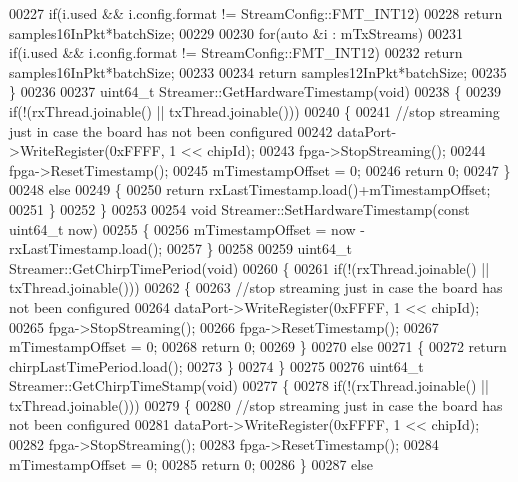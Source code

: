 \begin{DoxyCode}
00227         \textcolor{keywordflow}{if}(i.used && i.config.format != StreamConfig::FMT_INT12)
00228             \textcolor{keywordflow}{return} samples16InPkt*batchSize;
00229 
00230     \textcolor{keywordflow}{for}(\textcolor{keyword}{auto} &i : mTxStreams)
00231         \textcolor{keywordflow}{if}(i.used && i.config.format != StreamConfig::FMT_INT12)
00232             \textcolor{keywordflow}{return} samples16InPkt*batchSize;
00233 
00234     \textcolor{keywordflow}{return} samples12InPkt*batchSize;
00235 \}
00236 
00237 uint64\_t Streamer::GetHardwareTimestamp(\textcolor{keywordtype}{void})
00238 \{
00239     \textcolor{keywordflow}{if}(!(rxThread.joinable() || txThread.joinable()))
00240     \{
00241         \textcolor{comment}{//stop streaming just in case the board has not been configured}
00242         dataPort->WriteRegister(0xFFFF, 1 << chipId);
00243         fpga->StopStreaming();
00244         fpga->ResetTimestamp();
00245         mTimestampOffset = 0;
00246         \textcolor{keywordflow}{return} 0;
00247     \}
00248     \textcolor{keywordflow}{else}
00249     \{
00250         \textcolor{keywordflow}{return} rxLastTimestamp.load()+mTimestampOffset;
00251     \}
00252 \}
00253 
00254 \textcolor{keywordtype}{void} Streamer::SetHardwareTimestamp(\textcolor{keyword}{const} uint64\_t now)
00255 \{
00256     mTimestampOffset = now - rxLastTimestamp.load();
00257 \}
00258 
00259 uint64\_t Streamer::GetChirpTimePeriod(\textcolor{keywordtype}{void})
00260 \{
00261     \textcolor{keywordflow}{if}(!(rxThread.joinable() || txThread.joinable()))
00262     \{
00263         \textcolor{comment}{//stop streaming just in case the board has not been configured}
00264         dataPort->WriteRegister(0xFFFF, 1 << chipId);
00265         fpga->StopStreaming();
00266         fpga->ResetTimestamp();
00267         mTimestampOffset = 0;
00268         \textcolor{keywordflow}{return} 0;
00269     \}
00270     \textcolor{keywordflow}{else}
00271     \{
00272         \textcolor{keywordflow}{return} chirpLastTimePeriod.load();
00273     \}
00274 \}
00275 
00276 uint64\_t Streamer::GetChirpTimeStamp(\textcolor{keywordtype}{void})
00277 \{
00278     \textcolor{keywordflow}{if}(!(rxThread.joinable() || txThread.joinable()))
00279     \{
00280         \textcolor{comment}{//stop streaming just in case the board has not been configured}
00281         dataPort->WriteRegister(0xFFFF, 1 << chipId);
00282         fpga->StopStreaming();
00283         fpga->ResetTimestamp();
00284         mTimestampOffset = 0;
00285         \textcolor{keywordflow}{return} 0;
00286     \}
00287     \textcolor{keywordflow}{else}

\end{DoxyCode}
